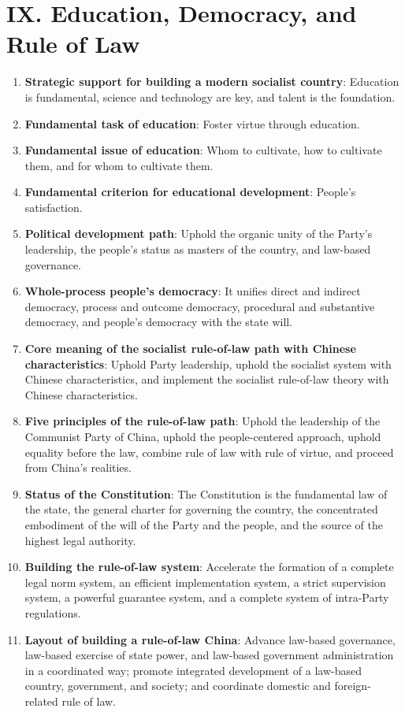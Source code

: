 \documentclass[11pt,a4paper]{ctexart}
\begin{document}
\section{IX. Education, Democracy, and Rule of Law}

\begin{enumerate}[leftmargin=2em]
    \item \textbf{Strategic support for building a modern socialist country}: Education is fundamental, science and technology are key, and talent is the foundation.
    \item \textbf{Fundamental task of education}: Foster virtue through education.
    \item \textbf{Fundamental issue of education}: Whom to cultivate, how to cultivate them, and for whom to cultivate them.
    \item \textbf{Fundamental criterion for educational development}: People's satisfaction.
    \item \textbf{Political development path}: Uphold the organic unity of the Party's leadership, the people's status as masters of the country, and law-based governance.
    \item \textbf{Whole-process people's democracy}: It unifies direct and indirect democracy, process and outcome democracy, procedural and substantive democracy, and people's democracy with the state will.
    \item \textbf{Core meaning of the socialist rule-of-law path with Chinese characteristics}: Uphold Party leadership, uphold the socialist system with Chinese characteristics, and implement the socialist rule-of-law theory with Chinese characteristics.
    \item \textbf{Five principles of the rule-of-law path}: Uphold the leadership of the Communist Party of China, uphold the people-centered approach, uphold equality before the law, combine rule of law with rule of virtue, and proceed from China's realities.
    \item \textbf{Status of the Constitution}: The Constitution is the fundamental law of the state, the general charter for governing the country, the concentrated embodiment of the will of the Party and the people, and the source of the highest legal authority.
    \item \textbf{Building the rule-of-law system}: Accelerate the formation of a complete legal norm system, an efficient implementation system, a strict supervision system, a powerful guarantee system, and a complete system of intra-Party regulations.
    \item \textbf{Layout of building a rule-of-law China}: Advance law-based governance, law-based exercise of state power, and law-based government administration in a coordinated way; promote integrated development of a law-based country, government, and society; and coordinate domestic and foreign-related rule of law.
\end{enumerate}
\end{document}
